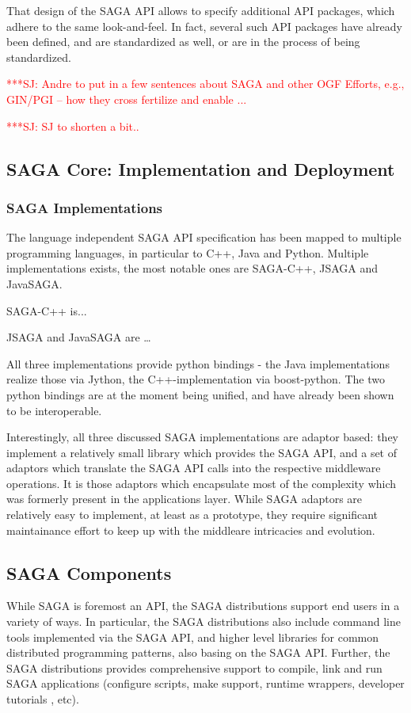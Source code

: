 \documentclass[12pt]{article}
\newcommand{\jhanote}[1]{ {\textcolor{red}     {***SJ: #1}}}
\newcommand{\jhanote}[1]{}
\begin{document}
  That design of the SAGA API allows to specify additional API
  packages, which adhere to the same look-and-feel.  In fact, several
  such API packages have already been defined, and are standardized as
  well, or are in the process of being standardized.

  \jhanote{Andre to put in a few sentences about SAGA and other OGF
    Efforts, e.g., GIN/PGI -- how they cross fertilize and enable ...}

  \jhanote{SJ to shorten a bit..}

  \subsection{SAGA Core: Implementation and Deployment}

  \subsubsection{SAGA Implementations}

  The language independent SAGA API specification has been mapped to
  multiple programming languages, in particular to C++, Java and
  Python.  Multiple implementations exists, the most notable ones are
  SAGA-C++, JSAGA and JavaSAGA.

  SAGA-C++ is...

  JSAGA and JavaSAGA are …

  All three implementations provide python bindings - the Java
  implementations realize those via Jython, the C++-implementation via
  boost-python.  The two python bindings are at the moment being
  unified, and have already been shown to be interoperable.

  Interestingly, all three discussed SAGA implementations are adaptor
  based: they implement a relatively small library which provides the
  SAGA API, and a set of adaptors which translate the SAGA API calls
  into the respective middleware operations.  It is those adaptors
  which encapsulate most of the complexity which was formerly present
  in the applications layer.  While SAGA adaptors are relatively easy
  to implement, at least as a prototype, they require significant
  maintainance effort to keep up with the middleare intricacies and
  evolution.

 \subsection{SAGA Components}

 While SAGA is foremost an API, the SAGA distributions support end
  users in a variety of ways.  In particular, the SAGA distributions
  also include command line tools implemented via the SAGA API, and
  higher level libraries for common distributed programming patterns,
  also basing on the SAGA API.  Further, the SAGA distributions
  provides comprehensive support to compile, link and run SAGA
  applications (configure scripts, make support, runtime wrappers,
  developer tutorials , etc).
\end{document}
